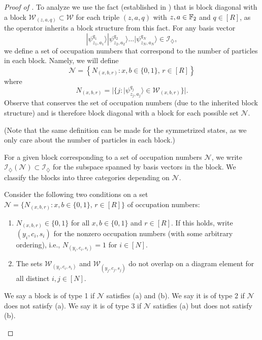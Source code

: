\documentclass[../thesis-main/thesis-main]{subfiles}
\begin{document}
\begin{proof}[Proof of \protect{}]
To analyze  we use the fact (established in ) that  is block diagonal with a block $\mathcal{W}_{(z,a,q)}\subset\mathcal{W}$ for each triple $(z,a,q)$ with $z,a\in\mathbb{F}_2$ and $q\in[R]$, as the operator  inherits a block structure from this fact. For any basis vector 
\begin{equation}
  |\psi_{z_{1},a_{1}}^{q_{1}}\rangle|\psi_{z_{2},a_{2}}^{q_{2}}\rangle\ldots|\psi_{z_{N},a_{N}}^{q_{N}}\rangle \in\mathcal{I}_{\diamondsuit},
\label{eq:basis_vector_in_scriptF}
\end{equation}
we define a set of occupation numbers that correspond to the number of particles in each block.  Namely, we will define
\begin{equation}
  \mathcal{N}=\left\{ N_{(x,b,r)} \colon x,b\in\{0,1\},\, r\in[R]\right\} 
\end{equation}
where
\begin{equation}
  N_{(x,b,r)}
  =|\{j \colon |\psi_{z_{j},a_{j}}^{q_{j}}\rangle\in\mathcal{W}_{(x,b,r)}\}|.
\end{equation}
Observe that  conserves the set of occupation numbers (due to the inherited block structure) and is therefore block diagonal with a block for each possible set $\mathcal{N}$. 

(Note that the same definition can be made for the symmetrized states, as we only care about the number of particles in each block.)

For a given block corresponding to a set of occupation numbers $\mathcal{N}$, we write $\mathcal{I}_{\diamondsuit}(\mathcal{N})\subset\mathcal{\mathcal{I}_{\diamondsuit}}$ for the subspace spanned by basis vectors  in the block. We classify the blocks into three categories depending on $\mathcal{N}$.

\begin{mdframed}[frametitle=Classification of the blocks of \eq{restriction to script R} according to $\mathcal{N}$]
Consider the following two conditions on a set $\mathcal{N}=\{ N_{(x,b,r)}\colon x,b\in\{0,1\},\, r\in[R]\}$
of occupation numbers:
\begin{enumerate}[label=(\alph*)]
\item $N_{(x,b,r)}\in\{0,1\}$ for all $x,b\in\{0,1\}$ and
$r\in[R]$. If this holds, write $\left(y_{i},c_{i},s_{i}\right)$ for the nonzero occupation numbers (with some arbitrary ordering), i.e., $N_{(y_{i},c_{i},s_{i})}=1$ for $i\in[N]$.
\item The sets $\mathcal{W}_{(y_{i},c_{i},s_{i})}$ and $\mathcal{W}_{(y_{j},c_{j},s_{j})}$
do not overlap on a diagram element for all distinct $i,j\in[N]$.
\end{enumerate}
We say a block is of type 1 if $\mathcal{N}$ satisfies (a) and (b). We say it is of type 2 if $\mathcal{N}$ does not satisfy (a). We say it is of type 3 if $\mathcal{N}$ satisfies (a) but does not satisfy (b).
\end{mdframed}



\end{proof}
\end{document}
